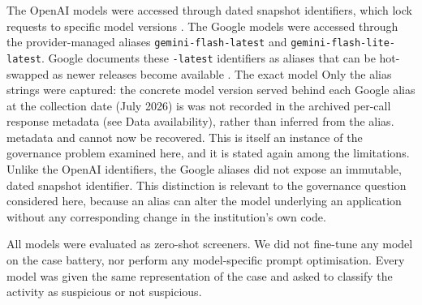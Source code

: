 \documentclass[pdflatex,sn-basic,Numbered]{sn-jnl}
\newcommand{\HLtext}[1]{\texthl{#1}}
\newcommand{\HLdel}[1]{\textcolor{HLink}{\sout{#1}}}
\renewcommand{\HLtext}[1]{#1}\renewcommand{\HLdel}[1]{#1}%
\begin{document}
The OpenAI models were accessed through dated snapshot identifiers, which lock requests to specific model versions \cite{openai-models}. The Google models were accessed through the provider-managed aliases \texttt{gemini-flash-latest} and \texttt{gemini-flash-lite-latest}\HLtext{.} Google documents these \texttt{-latest} identifiers as aliases that can be hot-swapped as newer releases become available \cite{google-models}. \HLdel{The exact model} \HLtext{Only the alias strings were captured: the concrete model version} served behind each Google alias at the collection date (July 2026) \HLdel{is} \HLtext{was not} recorded in the archived per-call \HLdel{response metadata (see Data availability), rather than inferred from the alias.} \HLtext{metadata and cannot now be recovered. This is itself an instance of the governance problem examined here, and it is stated again among the limitations.} Unlike the OpenAI identifiers, the Google aliases did not expose an immutable, dated snapshot identifier. This distinction is relevant to the governance question considered here, because an alias can alter the model underlying an application without any corresponding change in the institution's own code.

All models were evaluated as zero-shot screeners. We did not fine-tune any model on the case battery, nor perform any model-specific prompt optimisation. Every model was given the same representation of the case and asked to classify the activity as suspicious or not suspicious.
\end{document}
